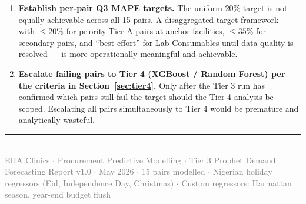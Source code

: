 \documentclass[12pt, a4paper]{article}
\begin{document}
\begin{enumerate}[leftmargin=1.5em, itemsep=7pt]
  \item \textbf{Establish per-pair Q3 MAPE targets.}
        The uniform 20\% target is not equally achievable across all
        15 pairs. A disaggregated target framework --- with
        $\leq 20\%$ for priority Tier A pairs at anchor facilities,
        $\leq 35\%$ for secondary pairs, and ``best-effort'' for
        Lab Consumables until data quality is resolved --- is more
        operationally meaningful and achievable.

  \item \textbf{Escalate failing pairs to Tier 4 (XGBoost / Random
        Forest) per the criteria in Section~\ref{sec:tier4}.}
        Only after the Tier 3 run has confirmed which pairs still fail
        the target should the Tier 4 analysis be scoped. Escalating
        all pairs simultaneously to Tier 4 would be premature and
        analytically wasteful.
\end{enumerate}

\vfill

\noindent\textcolor{ehaBlue!40!white}{\rule{\textwidth}{0.4pt}}\\[0.4em]
{\small\textcolor{gray}{EHA Clinics $\cdot$ Procurement Predictive Modelling $\cdot$
Tier 3 Prophet Demand Forecasting Report v1.0 $\cdot$ May 2026 $\cdot$
15 pairs modelled $\cdot$ Nigerian holiday regressors (Eid, Independence Day, Christmas) $\cdot$
Custom regressors: Harmattan season, year-end budget flush}}
\end{document}
